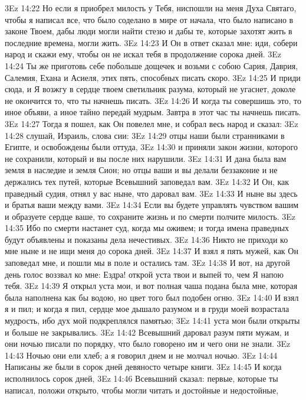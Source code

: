 \vs 3Ez 14:22 Но если я приобрел милость у Тебя, ниспошли на меня Духа Святаго, чтобы я написал все, что было соделано в мире от начала, что было написано в законе Твоем, дабы люди могли найти стезю и дабы те, которые захотят жить в последние времена, могли жить.
\vs 3Ez 14:23 И Он в ответ сказал мне: иди, собери народ и скажи ему, чтобы он не искал тебя в продолжение сорока дней.
\vs 3Ez 14:24 Ты же приготовь себе побольше дощечек и возьми с собою Сария, Даврия, Салемия, Ехана и Асиеля, этих пять, способных писать скоро.
\vs 3Ez 14:25 И приди сюда, и Я возжгу в сердце твоем светильник разума, который не угаснет, доколе не окончится то, что ты начнешь писать.
\vs 3Ez 14:26 И когда ты совершишь это, то иное объяви, а иное тайно передай мудрым. Завтра в этот час ты начнешь писать.
\vs 3Ez 14:27 Тогда я пошел, как Он повелел мне, и собрал весь народ и сказал:
\vs 3Ez 14:28 слушай, Израиль, слова сии:
\vs 3Ez 14:29 отцы наши были странниками в Египте, и освобождены были оттуда,
\vs 3Ez 14:30 и приняли закон жизни, которого не сохранили, который и вы после них нарушили.
\vs 3Ez 14:31 И дана была вам земля в наследие и земля Сион; но отцы ваши и вы делали беззаконие и не держались тех путей, которые Всевышний заповедал вам.
\vs 3Ez 14:32 И Он, как праведный судия, отнял у вас ныне, что даровал вам.
\vs 3Ez 14:33 И ныне вы здесь и братья ваши между вами.
\vs 3Ez 14:34 Если вы будете управлять чувством вашим и образуете сердце ваше, то сохраните жизнь и по смерти полчите милость.
\vs 3Ez 14:35 Ибо по смерти настанет суд, когда мы оживем; и тогда имена праведных будут объявлены и показаны дела нечестивых.
\vs 3Ez 14:36 Никто не приходи ко мне ныне и не ищи меня до сорока дней.
\vs 3Ez 14:37 И взял я пять мужей, как Он заповедал мне, и пошли мы в поле и остались там.
\vs 3Ez 14:38 И вот, на другой день голос воззвал ко мне: Ездра! открой уста твои и выпей то, чем Я напою тебя.
\vs 3Ez 14:39 Я открыл уста мои, и вот полная чаша подана была мне, которая была наполнена как бы водою, но цвет того был подобен огню.
\vs 3Ez 14:40 И взял я и пил; и когда я пил, сердце мое дышало разумом и в груди моей возрастала мудрость, ибо дух мой подкреплялся памятью;
\vs 3Ez 14:41 уста мои были открыты и больше не закрывались.
\vs 3Ez 14:42 Всевышний даровал разум пяти мужам, и они ночью писали по порядку, что было говорено им и чего они не знали.
\vs 3Ez 14:43 Ночью они ели хлеб; а я говорил днем и не молчал ночью.
\vs 3Ez 14:44 Написаны же были в сорок дней девяносто четыре книги.
\vs 3Ez 14:45 И когда исполнилось сорок дней,
\vs 3Ez 14:46 Всевышний сказал: первые, которые ты написал, положи открыто, чтобы могли читать и достойные и недостойные,
